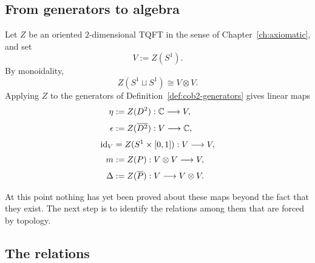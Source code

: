 \subsection{From generators to algebra}

Let $Z$ be an oriented $2$-dimensional TQFT in the sense of Chapter~\ref{ch:axiomatic}, and set
\begin{equation}\label{eq:circle-state-space}
V := Z(S^1).
\end{equation}
By monoidality,
\begin{equation}\label{eq:Z-two-circles}
Z(S^1 \sqcup S^1) \cong V \otimes V.
\end{equation}
Applying $Z$ to the generators of Definition~\ref{def:cob2-generators} gives linear maps
\begin{align}
\eta &:= Z(D^2) : \mathbb{C} \longrightarrow V, \label{eq:eta-generator} \\[1mm]
\epsilon &:= Z(\overline{D^2}) : V \longrightarrow \mathbb{C}, \label{eq:epsilon-generator} \\[1mm]
\operatorname{id}_V &= Z(S^1 \times [0,1]) : V \longrightarrow V, \label{eq:id-generator} \\[1mm]
m &:= Z(P) : V \otimes V \longrightarrow V, \label{eq:m-generator} \\[1mm]
\Delta &:= Z(\overline{P}) : V \longrightarrow V \otimes V. \label{eq:Delta-generator}
\end{align}

\noindent At this point nothing has yet been proved about these maps beyond the fact that they exist. The next step is to identify the relations among them that are forced by topology.

\subsection{The relations}

